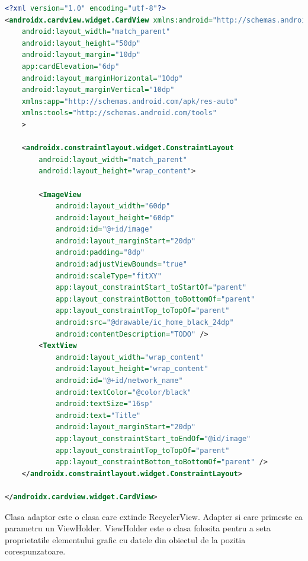 \begin{lstlisting}[language=XML]
<?xml version="1.0" encoding="utf-8"?>
<androidx.cardview.widget.CardView xmlns:android="http://schemas.android.com/apk/res/android"
    android:layout_width="match_parent"
    android:layout_height="50dp"
    android:layout_margin="10dp"
    app:cardElevation="6dp"
    android:layout_marginHorizontal="10dp"
    android:layout_marginVertical="10dp"
    xmlns:app="http://schemas.android.com/apk/res-auto"
    xmlns:tools="http://schemas.android.com/tools"
    >

    <androidx.constraintlayout.widget.ConstraintLayout
        android:layout_width="match_parent"
        android:layout_height="wrap_content">

        <ImageView
            android:layout_width="60dp"
            android:layout_height="60dp"
            android:id="@+id/image"
            android:layout_marginStart="20dp"
            android:padding="8dp"
            android:adjustViewBounds="true"
            android:scaleType="fitXY"
            app:layout_constraintStart_toStartOf="parent"
            app:layout_constraintBottom_toBottomOf="parent"
            app:layout_constraintTop_toTopOf="parent"
            android:src="@drawable/ic_home_black_24dp"
            android:contentDescription="TODO" />
        <TextView
            android:layout_width="wrap_content"
            android:layout_height="wrap_content"
            android:id="@+id/network_name"
            android:textColor="@color/black"
            android:textSize="16sp"
            android:text="Title"
            android:layout_marginStart="20dp"
            app:layout_constraintStart_toEndOf="@id/image"
            app:layout_constraintTop_toTopOf="parent"
            app:layout_constraintBottom_toBottomOf="parent" />
    </androidx.constraintlayout.widget.ConstraintLayout>

</androidx.cardview.widget.CardView>

\end{lstlisting}
Clasa adaptor este o clasa care extinde RecyclerView. Adapter si care primeste ca parametru un ViewHolder.
ViewHolder este o clasa folosita pentru a seta proprietatile elementului grafic cu datele din obiectul de la pozitia corespunzatoare.


